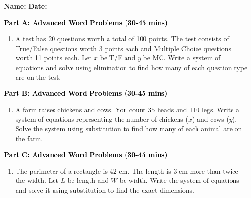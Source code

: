 \documentclass[12pt, letterpaper, fleqn]{article}
\begin{document}
\textbf{Name:} \underline{\hspace{5cm}}
\hfill
\textbf{Date:} \underline{\hspace{3cm}}\\


\begin{tcolorbox}[colback=customteal!20]
\large\textcolor{black}{\textbf{Part A: Advanced Word Problems (30-45 mins)}}
\end{tcolorbox}

\vspace{3mm}

\begin{enumerate}[itemsep=5.5cm, leftmargin=0.6cm]
\item A test has 20 questions worth a total of 100 points. The test consists of True/False questions worth 3 points each and Multiple Choice questions worth 11 points each. Let $x$ be T/F and $y$ be MC. Write a system of equations and solve using elimination to find how many of each question type are on the test.
\end{enumerate}

\newpage

\begin{tcolorbox}[colback=customteal!20]
\large\textcolor{black}{\textbf{Part B: Advanced Word Problems (30-45 mins)}}
\end{tcolorbox}

\vspace{3mm}

\begin{enumerate}[itemsep=5.5cm, leftmargin=0.6cm, resume]
\item A farm raises chickens and cows. You count 35 heads and 110 legs. Write a system of equations representing the number of chickens ($x$) and cows ($y$). Solve the system using substitution to find how many of each animal are on the farm.
\end{enumerate}

\newpage

\begin{tcolorbox}[colback=customteal!20]
\large\textcolor{black}{\textbf{Part C: Advanced Word Problems (30-45 mins)}}
\end{tcolorbox}

\vspace{3mm}

\begin{enumerate}[itemsep=5.5cm, leftmargin=0.6cm, resume]
\item The perimeter of a rectangle is $42\text{ cm}$. The length is $3\text{ cm}$ more than twice the width. Let $L$ be length and $W$ be width. Write the system of equations and solve it using substitution to find the exact dimensions.
\end{enumerate}
\end{document}
